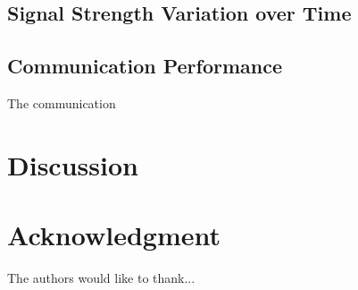 \documentclass[conference]{IEEEtran}
\begin{document}
\subsection{Signal Strength Variation over Time}

\subsection{Communication Performance}
The communication 
\section{Discussion}



\section*{Acknowledgment}


The authors would like to thank...








\end{document}
